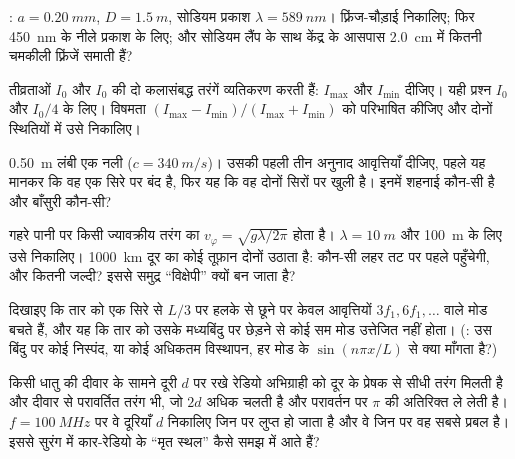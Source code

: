 \begin{exercise}[$\star\star$]\label{exo:b1:wave-propagation:7}
: $a = \qty{0.20}{mm}$, $D = \qty{1.5}{m}$, सोडियम प्रकाश
$\lambda = \qty{589}{nm}$। फ़्रिंज-चौड़ाई निकालिए; फिर \qty{450}{nm} के नीले
प्रकाश के लिए; और सोडियम लैंप के साथ केंद्र के आसपास \qty{2.0}{cm} में कितनी
चमकीली फ़्रिंजें समाती हैं?
\end{exercise}

\begin{exercise}[$\star\star$]\label{exo:b1:wave-propagation:8}
तीव्रताओं $I_0$ और $I_0$ की दो कलासंबद्ध तरंगें व्यतिकरण करती हैं:
$I_{\max}$ और $I_{\min}$ दीजिए। यही प्रश्न $I_0$ और $I_0/4$ के लिए।
विषमता $(I_{\max} - I_{\min})/(I_{\max} + I_{\min})$ को परिभाषित कीजिए और
दोनों स्थितियों में उसे निकालिए।
\end{exercise}

\begin{exercise}[$\star\star$]\label{exo:b1:wave-propagation:9}
\qty{0.50}{m} लंबी एक नली ($c = \qty{340}{m/s}$)। उसकी पहली तीन अनुनाद
आवृत्तियाँ दीजिए, पहले यह मानकर कि वह एक सिरे पर बंद है, फिर यह कि वह दोनों
सिरों पर खुली है। इनमें शहनाई कौन-सी है और बाँसुरी कौन-सी?
\end{exercise}

\begin{exercise}[$\star\star\star$]\label{exo:b1:wave-propagation:10}
गहरे पानी पर किसी ज्यावक्रीय तरंग का 
$v_\varphi = \sqrt{g\lambda/2\pi}$ होता है। $\lambda = \qty{10}{m}$
और \qty{100}{m} के लिए उसे निकालिए। \qty{1000}{km} दूर का कोई तूफ़ान दोनों
उठाता है: कौन-सी लहर तट पर पहले पहुँचेगी, और कितनी जल्दी? इससे समुद्र
``विक्षेपी'' क्यों बन जाता है?
\end{exercise}

\begin{exercise}[$\star\star\star$]\label{exo:b1:wave-propagation:11}
दिखाइए कि तार को एक सिरे से $L/3$ पर हलके से छूने पर केवल आवृत्तियों
$3f_1, 6f_1, \dots$ वाले मोड बचते हैं, और यह कि तार को उसके मध्यबिंदु पर
छेड़ने से कोई सम मोड उत्तेजित नहीं होता। (: उस बिंदु पर कोई निस्पंद, या
कोई अधिकतम विस्थापन, हर मोड के $\sin(n\pi x/L)$ से क्या माँगता है?)
\end{exercise}

\begin{exercise}[$\star\star\star$]\label{exo:b1:wave-propagation:12}
किसी धातु की दीवार के सामने दूरी $d$ पर रखे रेडियो अभिग्राही को दूर के
प्रेषक से सीधी तरंग मिलती है और दीवार से परावर्तित तरंग भी, जो $2d$ अधिक
चलती है और परावर्तन पर $\pi$ की अतिरिक्त  ले लेती है। $f = \qty{100}{MHz}$
पर वे दूरियाँ $d$ निकालिए जिन पर  लुप्त हो जाता है और वे जिन पर वह
सबसे प्रबल है। इससे सुरंग में कार-रेडियो के ``मृत स्थल'' कैसे समझ में आते हैं?
\end{exercise}

